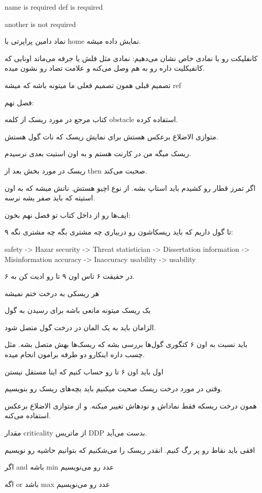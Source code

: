 name is required
def is required

another is not required

نماد دامین پراپرتی با home نمایش داده میشه.

کانفلیکت رو با نمادی خاص نشان می‌دهیم: نمادی مثل فلش یا جرفه می‌ماند اونایی که
کانفیکلیت داره رو به هم وصل می‌کنه و علامت تضاد رو نشون میده.

تصمیم قبلی همون تصمیم فعلی ما میتونه باشه که میشه ref

فصل نهم:

کتاب مرجع در مورد ریسک از کلمه obstacle استفاده کرده.

متوازی الاضلاع برعکس هستش برای نمایش ریسک که نات گول هستش.

ریسک میگه من در کارنت هستم و به اون استیت بعدی نرسیدم.

ریسک در مورد بخش بعد از then صحبت می‌کند.

اگر تمرز قطار رو کشیدم باید استاپ بشه. از نوع اچیو هستش. ناتش میشه که به اون
استیته که باید صفر بشه نرسه.

ایف‌ها رو از داخل کتاب تو فصل نهم بخون:

۹ تا گول داریم که باید ریسکاشون رو دربیاری چه مشتری بگه چه مشتری نگه:

safety -> Hazar
security -> Threat
statistician -> Dissertation
information -> Misinformation
accuracy -> Inaccuracy
usability -> usability

در حقیقت ۶ تاس اون ۹ تا رو ادیت کن به ۶.

هر ریسکی به درخت ختم نمیشه

یک ریسک میتونه مانعی باشه برای رسیدن به گول

الزامان باید به یک المان در درخت گول متصل شود.

باید نسبت به اون ۶ کتگوری گول‌ها بررسی بشه که ریسک‌ها بهش متصل بشه.
مثل چسب داره اینکارو دو طرفه برامون انجام میده.

اول باید اون ۶ تا رو حساب کنیم که اینا مستقل نیستن

وقتی در مورد درخت ریسک صحبت میکنیم باید بچه‌های ریسک رو بنویسیم.

همون درخت ریسکه فقط نماداش و نود‌هاش تغییر میکنه. و از متوازی الاضلاع برعکس
استفاده می‌کنه.

مقدار criticality از ماتریس DDP بدست می‌آید.

افقی باید نقاط رو پر رگ کنیم.
انقدر ریسک را می‌شکنیم که بتوانیم حاشیه رو نویسیم

اگر and باشه min عدد رو می‌نویسیم

اگه or باشد max عدد رو می‌نویسیم

